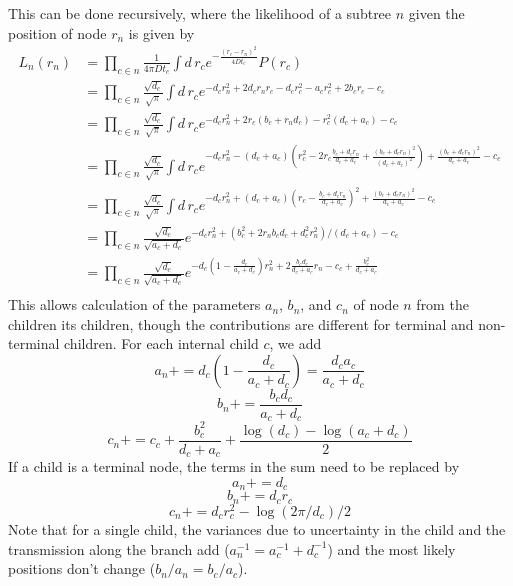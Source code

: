 \documentclass[aps,rmp, onecolumn]{revtex4}
\begin{document}
This can be done recursively, where the likelihood of a subtree $n$ given the position of node $r_n$ is given by
\begin{equation}
    \begin{split}
        L_n(r_n) & = \prod_{c\in n}\frac{1}{4\pi D t_c}\int  d\, r_c e^{- \frac{(r_c - r_n)^2}{4Dt_c}}P(r_c) \\
        & = \prod_{c\in n} \frac{\sqrt{d_c}}{\sqrt{\pi}}\int d\, r_c e^{- d_c r_n^2 + 2d_c r_n r_c - d_c r_c^2 - a_c r_c^2 + 2 b_c r_c - c_c} \\
        & = \prod_{c\in n} \frac{\sqrt{d_c}}{\sqrt{\pi}}\int d\, r_c e^{- d_c r_n^2 + 2r_c(b_c + r_n d_c) - r_c^2 \left(d_c + a_c\right) - c_c} \\
        & = \prod_{c\in n} \frac{\sqrt{d_c}}{\sqrt{\pi}}\int d\, r_c e^{- d_c r_n^2 - (d_c + a_c)(r_c^2 - 2r_c\frac{b_c + d_c r_n}{d_c + a_c} + \frac{(b_c + d_c r_n)^2}{(d_c + a_c)^2}) + \frac{(b_c + d_c r_n)^2}{d_c + a_c} - c_c} \\
        & = \prod_{c\in n} \frac{\sqrt{d_c}}{\sqrt{\pi}}\int d\, r_c e^{- d_c r_n^2 + (d_c + a_c)(r_c - \frac{b_c + d_c r_n}{d_c + a_c})^2 + \frac{(b_c + d_c r_n)^2}{d_c + a_c} - c_c} \\
        & = \prod_{c\in n}\frac{\sqrt{d_c}}{\sqrt{a_c + d_c}} e^{- d_c r_n^2 + (b_c^2 + 2r_n b_c d_c + d_c^2 r_n^2 )/\left(d_c + a_c\right) - c_c} \\
        & = \prod_{c\in n}\frac{\sqrt{d_c}}{\sqrt{a_c + d_c}} e^{- d_c\left(1 - \frac{d_c}{a_c+d_c}\right) r_n^2 +  2\frac{b_c d_c}{d_c+a_c} r_n  - c_c + \frac{b_c^2}{d_c + a_c}} \\
    \end{split}
\end{equation}
This allows calculation of the parameters $a_n$, $b_n$, and $c_n$ of node $n$ from the children its children, though the contributions are different for terminal and non-terminal children.
For each internal child $c$, we add
\begin{equation}
    a_n += d_c \left(1-\frac{d_c}{a_c+d_c}\right) = \frac{d_c a_c}{a_c+d_c}
\end{equation}
\begin{equation}
    b_n += \frac{b_c d_c}{a_c + d_c}
\end{equation}
\begin{equation}
    c_n += c_c  + \frac{b_c^2}{d_c + a_c} + \frac{\log(d_c) - \log(a_c+d_c)}{2}
\end{equation}
If a child is a terminal node, the terms in the sum need to be replaced by
\begin{equation}
    a_n +=  d_c
\end{equation}
\begin{equation}
    b_n += d_c r_c
\end{equation}
\begin{equation}
    c_n += d_c r_c^2 - \log(2\pi/d_c)/2
\end{equation}
Note that for a single child, the variances due to uncertainty in the child and the transmission along the branch add ($a_n^{-1} = a_c^{-1} + d_c^{-1}$) and the most likely positions don't change ($b_n/a_n = b_c/a_c$).
\end{document}
